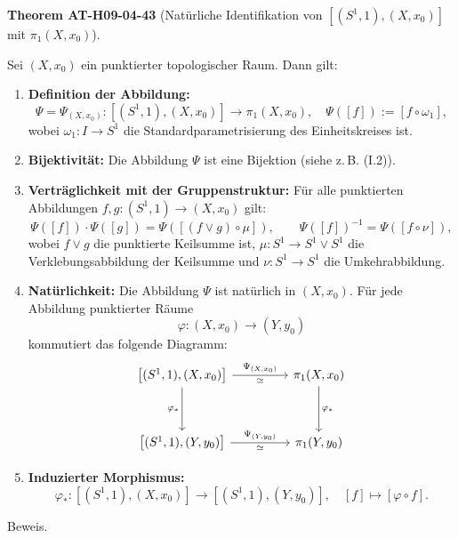 \documentclass[10pt, letterpaper]{article}
\newcommand{\CustomHeading}[3]{%
  \par\medskip\noindent%
  \textbf{#1 #2} \textnormal{(#3)}.\enskip%
}
\newenvironment{THEO}[2]{\begin{unitbox}\CustomHeading{Theorem}{#1}{#2}}{\end{unitbox}}
\begin{document}
\begin{THEO}{AT-H09-04-43}{Natürliche Identifikation von $\left[\left(S^1, 1\right),\left(X, x_0\right)\right]$ mit $\pi_1\left(X, x_0\right)$}
Sei $(X, x_0)$ ein punktierter topologischer Raum. Dann gilt:
\begin{enumerate}
  \item \textbf{Definition der Abbildung:}
  \[
  \Psi = \Psi_{(X, x_0)} : \left[(S^1, 1), (X, x_0)\right] \longrightarrow \pi_1(X, x_0), \quad \Psi([f]) := [f \circ \omega_1],
  \]
  wobei $\omega_1 : I \to S^1$ die Standardparametrisierung des Einheitskreises ist.

  \item \textbf{Bijektivität:}  
  Die Abbildung $\Psi$ ist eine Bijektion (siehe z.\,B. (I.2)).

  \item \textbf{Verträglichkeit mit der Gruppenstruktur:}  
  Für alle punktierten Abbildungen $f, g : (S^1,1) \to (X,x_0)$ gilt:
  \[
  \Psi([f]) \cdot \Psi([g]) = \Psi([(f \vee g) \circ \mu]), \qquad
  \Psi([f])^{-1} = \Psi([f \circ \nu]),
  \]
  wobei $f \vee g$ die punktierte Keilsumme ist, $\mu : S^1 \to S^1 \vee S^1$ die Verklebungsabbildung der Keilsumme und $\nu : S^1 \to S^1$ die Umkehrabbildung.

  \item \textbf{Natürlichkeit:}  
  Die Abbildung $\Psi$ ist natürlich in $(X,x_0)$. Für jede Abbildung punktierter Räume
  \[
  \varphi : (X,x_0) \to (Y,y_0)
  \]
  kommutiert das folgende Diagramm:
  \[
  \begin{tikzcd}[row sep=3.5em, column sep=4.5em]
  {\left[(S^1, 1), (X, x_0)\right]} \arrow[r, "\Psi_{(X,x_0)}", "\simeq"'] \arrow[d, "\varphi_*"'] &
  \pi_1(X, x_0) \arrow[d, "\varphi_*"] \\
  {\left[(S^1, 1), (Y, y_0)\right]} \arrow[r, "\Psi_{(Y,y_0)}", "\simeq"'] &
  \pi_1(Y, y_0)
  \end{tikzcd}
  \]

  \item \textbf{Induzierter Morphismus:}  
  \[
  \varphi_* : \left[(S^1, 1), (X, x_0)\right] \longrightarrow \left[(S^1, 1), (Y, y_0)\right], \quad [f] \mapsto [\varphi \circ f].
  \]
\end{enumerate}
\end{THEO}

Beweis. 
\end{document}

